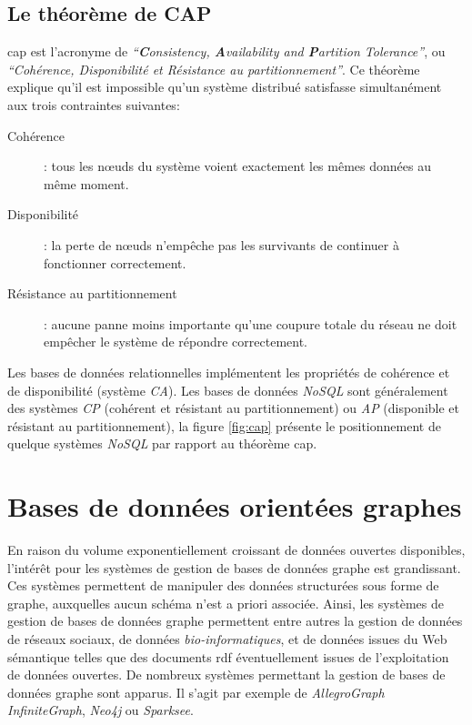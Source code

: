   \subsection{Le théorème de CAP }
  \label{sec:cap}
  \acrshort{cap} \cite{brewer2000towards} est l'acronyme de
  \textit{``\textbf{C}onsistency, \textbf{A}vailability and
    \textbf{P}artition Tolerance''}, ou \textit{``Cohérence,
    Disponibilité et Résistance au partitionnement''}. Ce théorème
  explique qu'il est impossible qu'un système distribué satisfasse
  simultanément aux trois contraintes suivantes:\medskip

  \renewcommand{\descriptionlabel}[1]{\hspace{1cm}\textbullet~\textsf{#1}}
  \begin{description}
  \item [Cohérence]: tous les nœuds du système voient exactement les
    mêmes données au même moment.

  \item [Disponibilité]: la perte de nœuds n'empêche pas les
    survivants de continuer à fonctionner correctement.

  \item [Résistance au partitionnement]: aucune panne moins importante
    qu'une coupure totale du réseau ne doit empêcher le système de
    répondre correctement.
  \end{description}
  \enddescription
  \bigskip

  

  \newpage

  Les bases de données relationnelles implémentent les propriétés de
  cohérence et de disponibilité (système \emph{CA}). Les bases de
  données \emph{NoSQL} sont généralement des systèmes \emph{CP}
  (cohérent et résistant au partitionnement) ou \emph{AP} (disponible
  et résistant au partitionnement), la figure \ref{fig:cap} présente
  le positionnement de quelque systèmes \emph{NoSQL} par rapport au
  théorème \acrshort{cap}.

\section{Bases de données orientées graphes}
\label{sec:graph-database-overview}
En raison du volume exponentiellement croissant de données ouvertes
disponibles, l'intérêt pour les systèmes de gestion de bases de
données graphe est grandissant. Ces systèmes permettent de manipuler
des données structurées sous forme de graphe, auxquelles aucun schéma
n'est a priori associée. Ainsi, les systèmes de gestion de bases de
données graphe permettent entre autres la gestion de données de
réseaux sociaux, de données \textit{bio-informatiques}, et de données
issues du Web sémantique telles que des documents \acrshort{rdf}
éventuellement issues de l'exploitation de données ouvertes. De
nombreux systèmes permettant la gestion de bases de données graphe
sont apparus. Il s'agit par exemple de \textit{AllegroGraph}
\textit{InfiniteGraph}, \textit{Neo4j} ou \textit{Sparksee}.\medskip

